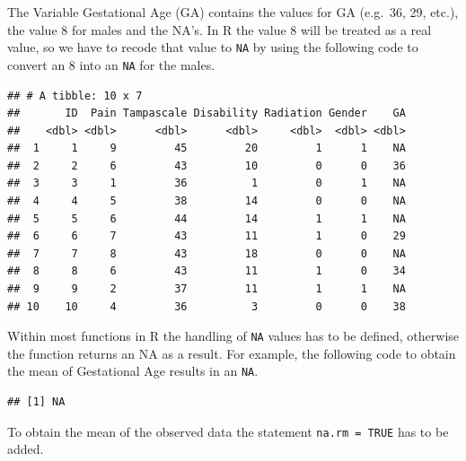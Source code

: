 \documentclass[
]{book}
\newenvironment{Shaded}{\begin{snugshade}}{\end{snugshade}}
\newcommand{\ConstantTok}[1]{\textcolor[rgb]{0.00,0.00,0.00}{#1}}
\newcommand{\DecValTok}[1]{\textcolor[rgb]{0.00,0.00,0.81}{#1}}
\newcommand{\FunctionTok}[1]{\textcolor[rgb]{0.00,0.00,0.00}{#1}}
\newcommand{\NormalTok}[1]{#1}
\newcommand{\OtherTok}[1]{\textcolor[rgb]{0.56,0.35,0.01}{#1}}
\newcommand{\SpecialCharTok}[1]{\textcolor[rgb]{0.00,0.00,0.00}{#1}}
\begin{document}
The Variable Gestational Age (GA) contains the values for GA (e.g.~36, 29, etc.), the value 8 for males and the NA's. In R the value 8 will be treated as a real value, so we have to recode that value to \texttt{NA} by using the following code to convert an 8 into an \texttt{NA} for the males.

\begin{Shaded}
\end{Shaded}

\begin{verbatim}
## # A tibble: 10 x 7
##       ID  Pain Tampascale Disability Radiation Gender    GA
##    <dbl> <dbl>      <dbl>      <dbl>     <dbl>  <dbl> <dbl>
##  1     1     9         45         20         1      1    NA
##  2     2     6         43         10         0      0    36
##  3     3     1         36          1         0      1    NA
##  4     4     5         38         14         0      0    NA
##  5     5     6         44         14         1      1    NA
##  6     6     7         43         11         1      0    29
##  7     7     8         43         18         0      0    NA
##  8     8     6         43         11         1      0    34
##  9     9     2         37         11         1      1    NA
## 10    10     4         36          3         0      0    38
\end{verbatim}

Within most functions in R the handling of \texttt{NA} values has to be defined, otherwise the function returns an NA as a result. For example, the following code to obtain the mean of Gestational Age results in an \texttt{NA}.

\begin{Shaded}
\end{Shaded}

\begin{verbatim}
## [1] NA
\end{verbatim}

To obtain the mean of the observed data the statement \texttt{na.rm\ =\ TRUE} has to be added.
\end{document}
